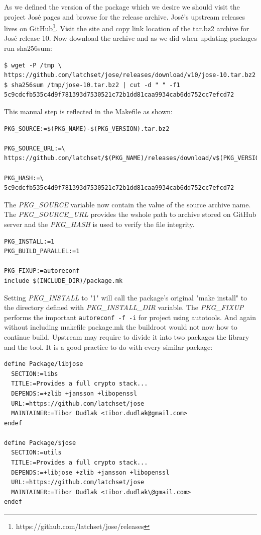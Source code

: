 As we defined the version of the package which we desire we should visit the project José pages and browse for the release archive.
José's upstream releases lives on GitHub\footnote{https://github.com/latchset/jose/releases}.
Visit the site and copy link location of the tar.bz2 archive for José release 10.
Now download the archive and as we did when updating packages run sha256sum:
\begin{lstlisting}[columns=fixed,basicstyle=\ttfamily\footnotesize,tabsize=4,backgroundcolor=\color{yellow!10}]
$ wget -P /tmp \
https://github.com/latchset/jose/releases/download/v10/jose-10.tar.bz2
$ sha256sum /tmp/jose-10.tar.bz2 | cut -d " " -f1
5c9cdcfb535c4d9f781393d7530521c72b1dd81caa9934cab6dd752cc7efcd72
\end{lstlisting}
This manual step is reflected in the Makefile as shown:
\begin{lstlisting}[columns=fixed,basicstyle=\ttfamily\footnotesize,tabsize=4,backgroundcolor=\color{yellow!10}]
PKG_SOURCE:=$(PKG_NAME)-$(PKG_VERSION).tar.bz2

PKG_SOURCE_URL:=\
https://github.com/latchset/$(PKG_NAME)/releases/download/v$(PKG_VERSION)/

PKG_HASH:=\
5c9cdcfb535c4d9f781393d7530521c72b1dd81caa9934cab6dd752cc7efcd72
\end{lstlisting}
The {\it PKG\_SOURCE} variable now contain the value of the source archive name.
The {\it PKG\_SOURCE\_URL} provides the wshole path to archive stored on GitHub server and the {\it PKG\_HASH} is used to verify the file integrity.
\begin{lstlisting}[columns=fixed,basicstyle=\ttfamily\footnotesize,tabsize=4,backgroundcolor=\color{yellow!10}]
PKG_INSTALL:=1
PKG_BUILD_PARALLEL:=1

PKG_FIXUP:=autoreconf
include $(INCLUDE_DIR)/package.mk
\end{lstlisting}
Setting {\it PKG\_INSTALL} to "1" will call the package's original "make install" to the directory defined with {\it PKG\_INSTALL\_DIR} variable.
The {\it PKG\_FIXUP} performs the important {\tt autoreconf -f -i} for project using autotools.
And again without including makefile package.mk the buildroot would not now how to continue build.
Upstream may require to divide it into two packages the library and the tool.
It is a good practice to do with every similar package:
\begin{lstlisting}[columns=fixed,basicstyle=\ttfamily\footnotesize,tabsize=4,backgroundcolor=\color{yellow!10}]
define Package/libjose
  SECTION:=libs
  TITLE:=Provides a full crypto stack...
  DEPENDS:=+zlib +jansson +libopenssl
  URL:=https://github.com/latchset/jose
  MAINTAINER:=Tibor Dudlak <tibor.dudlak@gmail.com>
endef

define Package/$jose
  SECTION:=utils
  TITLE:=Provides a full crypto stack...
  DEPENDS:=+libjose +zlib +jansson +libopenssl
  URL:=https://github.com/latchset/jose
  MAINTAINER:=Tibor Dudlak <tibor.dudlak\@gmail.com>
endef
\end{lstlisting}
